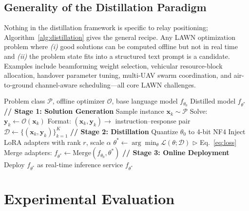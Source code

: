 \documentclass[journal]{IEEEtran}
\begin{document}
\subsection{Generality of the Distillation Paradigm}

Nothing in the distillation framework is specific to relay positioning; Algorithm~\ref{alg:distillation} gives the general recipe. Any LAWN optimization problem where \emph{(i)} good solutions can be computed offline but not in real time and \emph{(ii)} the problem state fits into a structured text prompt is a candidate. Examples include beamforming weight selection, vehicular resource-block allocation, handover parameter tuning, multi-UAV swarm coordination, and air-to-ground channel-aware scheduling---all core LAWN challenges.

\begin{algorithm}[!t]
\caption{Optimizer Distillation for Real-Time Network Optimization}
\label{alg:distillation}
\begin{algorithmic}[1]
\renewcommand{\algorithmicrequire}{\textbf{Input:}}
\renewcommand{\algorithmicensure}{\textbf{Output:}}
\REQUIRE Problem class $\mathcal{P}$, offline optimizer $\mathcal{O}$, base language model $f_{\theta_0}$
\ENSURE Distilled model $f_{\theta^*}$
\STATE \textbf{// Stage 1: Solution Generation}
    \STATE Sample instance $\mathbf{x}_k \sim \mathcal{P}$
    \STATE Solve: $\mathbf{y}_k \leftarrow \mathcal{O}(\mathbf{x}_k)$
    \STATE Format: $(\mathbf{x}_k, \mathbf{y}_k) \rightarrow$ instruction--response pair
\ENDFOR
\STATE $\mathcal{D} \leftarrow \{(\mathbf{x}_k, \mathbf{y}_k)\}_{k=1}^{K}$
\STATE \textbf{// Stage 2: Distillation}
\STATE Quantize $\theta_0$ to 4-bit NF4
\STATE Inject LoRA adapters with rank $r$, scale $\alpha$
\STATE $\theta^* \leftarrow \arg\min_\theta \mathcal{L}(\theta; \mathcal{D})$ \hfill $\triangleright$ Eq.~\eqref{eq:loss}
\STATE Merge adapters: $f_{\theta^*} \leftarrow \text{Merge}(f_{\theta_0}, \theta^*)$
\STATE \textbf{// Stage 3: Online Deployment}
\STATE Deploy $f_{\theta^*}$ as real-time inference service
\RETURN $f_{\theta^*}$
\end{algorithmic}
\end{algorithm}


\section{Experimental Evaluation}
\label{sec:results}
\end{document}
